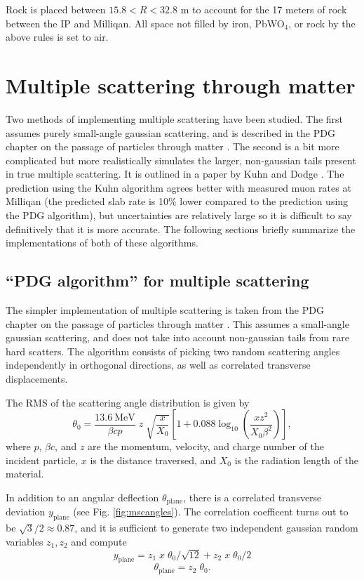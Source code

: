 \documentclass[11pt]{article}
\begin{document}
Rock is placed between $15.8 < R < 32.8$ m to account for the 17 meters of rock between the IP and Milliqan. All space not filled by
iron, PbWO$_4$, or rock by the above rules is set to air.

\section{Multiple scattering through matter}
Two methods of implementing multiple scattering have been studied. The first assumes purely small-angle gaussian scattering, and is described
in the PDG chapter on the passage of particles through matter \cite{PDG_matter}. The second is a bit more complicated but more realistically
simulates the larger, non-gaussian tails present in true multiple scattering. It is outlined in a paper by Kuhn and Dodge \cite{kuhn_msc}.
The prediction using the Kuhn algorithm agrees better with measured muon rates at Milliqan (the predicted slab rate is 10\% lower
compared to the prediction using the PDG algorithm), but uncertainties are relatively large
so it is difficult to say definitively that it is more accurate.
The following sections briefly summarize the implementations of both of these algorithms.

\subsection{``PDG algorithm'' for multiple scattering}
\label{sec:pdg_msc}

The simpler implementation of multiple scattering is taken from the PDG chapter on the passage of particles through matter \cite{PDG_matter}.
This assumes a small-angle gaussian scattering, and does not take into account non-gaussian tails from rare hard scatters. 
The algorithm consists of picking two random scattering angles independently in orthogonal directions, as well as correlated transverse displacements.

The RMS of the scattering angle distribution is given by
\begin{equation}\label{eq:thrms}
\theta_0 = \frac{13.6~\text{MeV}}{\beta cp}\;z\;\sqrt{\frac{x}{X_0}}\left[1 + 0.088\log_{10}\left(\frac{xz^2}{X_0\beta^2}\right) \right],
\end{equation}
where $p$, $\beta c$, and $z$ are the momentum, velocity, and charge number of the incident particle, $x$ is the distance traversed, and 
$X_0$ is the radiation length of the material.

In addition to an angular deflection $\theta_\text{plane}$, there is a correlated transverse deviation $y_\text{plane}$ (see Fig. \ref{fig:mscangles}). The correlation coefficent
turns out to be $\sqrt{3}/2\approx0.87$, and it is sufficient to generate two independent gaussian random variables $z_1,z_2$ and compute
\begin{equation}\label{eq:msc}
y_\text{plane} = z_1\;x\;\theta_0/\sqrt{12} + z_2\;x\;\theta_0/2
\end{equation}
\[
\theta_\text{plane} = z_2\;\theta_0.
\]
\end{document}
